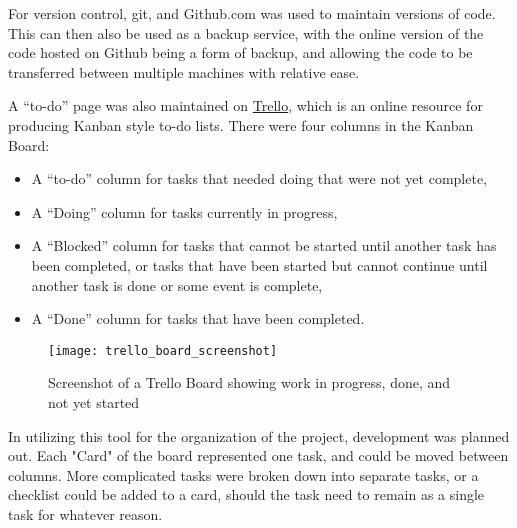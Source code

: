 For version control, git, and Github.com was used to maintain versions of code. This can then also be used as a backup service, with the online version of the code hosted on Github being a form of backup, and allowing the code to be transferred between multiple machines with relative ease.

 A “to-do” page was also maintained on \href{https://trello.com}{Trello}, which is an online resource for producing Kanban style to-do lists. There were four columns in the Kanban Board: 
\begin{itemize}
	\item A “to-do” column for tasks that needed doing that were not yet complete, 
	\item A  “Doing” column for tasks currently in progress, 
	\item A “Blocked” column for tasks that cannot be started until another task has been completed, or tasks that have been started but cannot continue until another task is done or some event is complete,
	\item A “Done” column for tasks that have been completed.
\end{itemize}

\begin{figure}[ht]
	\texttt{[image: trello\_board\_screenshot]}
	\caption{Screenshot of a Trello Board showing work in progress, done, and not yet started}
	\label{fig:trello_screenshot}
\end{figure}

In utilizing this tool for the organization of the project, development was planned out. Each "Card" of the board represented one task, and could be moved between columns. More complicated tasks were broken down into separate tasks, or a checklist could be added to a card, should the task need to remain as a single task for whatever reason.

